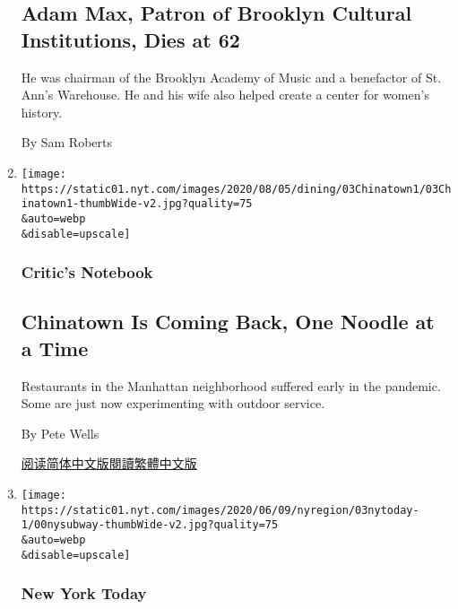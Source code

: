 \begin{enumerate}
{  \subsection{Adam Max, Patron of Brooklyn Cultural Institutions, Dies
  at
  62}\label{adam-max-patron-of-brooklyn-cultural-institutions-dies-at-62}}

  He was chairman of the Brooklyn Academy of Music and a benefactor of
  St. Ann's Warehouse. He and his wife also helped create a center for
  women's history.

  By Sam Roberts
\item
  \href{/2020/08/03/dining/chinatown-outdoor-dining-coronavirus.html}{}

  \texttt{[image: https://static01.nyt.com/images/2020/08/05/dining/03Chinatown1/03Chinatown1-thumbWide-v2.jpg?quality=75\\\&auto=webp\\\&disable=upscale]}

  \hypertarget{critics-notebook}{%
  \subsubsection{Critic's Notebook}\label{critics-notebook}}

  \hypertarget{chinatown-is-coming-back-one-noodle-at-a-time}{%
  \subsection{Chinatown Is Coming Back, One Noodle at a
  Time}\label{chinatown-is-coming-back-one-noodle-at-a-time}}

  Restaurants in the Manhattan neighborhood suffered early in the
  pandemic. Some are just now experimenting with outdoor service.

  By Pete Wells

  \href{https://cn.nytimes.com/style/20200804/chinatown-outdoor-dining-coronavirus/}{阅读简体中文版}\href{https://cn.nytimes.com/style/20200804/chinatown-outdoor-dining-coronavirus/zh-hant/}{閱讀繁體中文版}
\item
  \href{/2020/08/03/nyregion/nyc-subway-coronavirus.html}{}

  \texttt{[image: https://static01.nyt.com/images/2020/06/09/nyregion/03nytoday-1/00nysubway-thumbWide-v2.jpg?quality=75\\\&auto=webp\\\&disable=upscale]}

  \hypertarget{new-york-today-1}{%
  \subsubsection{New York Today}\label{new-york-today-1}}


\end{enumerate}
